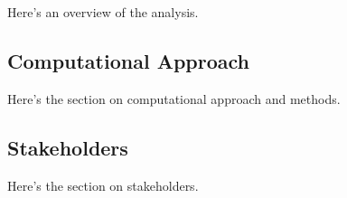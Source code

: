 \documentclass[../main.tex]{subfiles}
\begin{document}
Here's an overview of the analysis.

\subsection{Computational Approach}

Here's the section on computational approach and methods.

\subsection{Stakeholders}

Here's the section on stakeholders.
\end{document}
